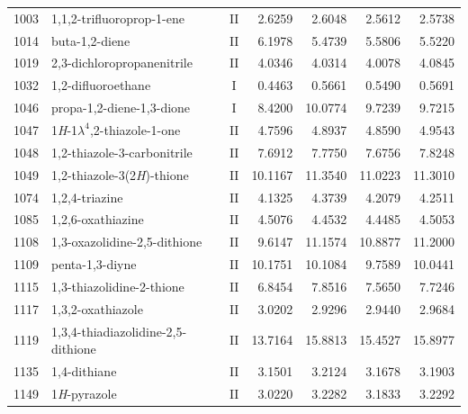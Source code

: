 \begin{longtable}{rlcd{2.5}d{2.5}d{2.5}d{2.5}}
    1003 & 1,1,2-trifluoroprop-1-ene                              & II & 2.6259  & 2.6048  & 2.5612  & 2.5738  \\
    1014 & buta-1,2-diene                                         & II & 6.1978  & 5.4739  & 5.5806  & 5.5220  \\
    1019 & 2,3-dichloropropanenitrile                             & II & 4.0346  & 4.0314  & 4.0078  & 4.0845  \\
    1032 & 1,2-difluoroethane                                     & I  & 0.4463  & 0.5661  & 0.5490  & 0.5691  \\
    1046 & propa-1,2-diene-1,3-dione                              & I  & 8.4200  & 10.0774 & 9.7239  & 9.7215  \\
    1047 & 1\textit{H}-1$\lambda^4$,2-thiazole-1-one              & II & 4.7596  & 4.8937  & 4.8590  & 4.9543  \\
    1048 & 1,2-thiazole-3-carbonitrile                            & II & 7.6912  & 7.7750  & 7.6756  & 7.8248  \\
    1049 & 1,2-thiazole-3(2\textit{H})-thione                     & II & 10.1167 & 11.3540 & 11.0223 & 11.3010 \\
    1074 & 1,2,4-triazine                                         & II & 4.1325  & 4.3739  & 4.2079  & 4.2511  \\
    1085 & 1,2,6-oxathiazine                                      & II & 4.5076  & 4.4532  & 4.4485  & 4.5053  \\
    1108 & 1,3-oxazolidine-2,5-dithione                           & II & 9.6147  & 11.1574 & 10.8877 & 11.2000 \\
    1109 & penta-1,3-diyne                                        & II & 10.1751 & 10.1084 & 9.7589  & 10.0441 \\
    1115 & 1,3-thiazolidine-2-thione                              & II & 6.8454  & 7.8516  & 7.5650  & 7.7246  \\
    1117 & 1,3,2-oxathiazole                                      & II & 3.0202  & 2.9296  & 2.9440  & 2.9684  \\
    1119 & 1,3,4-thiadiazolidine-2,5-dithione                     & II & 13.7164 & 15.8813 & 15.4527 & 15.8977 \\
    1135 & 1,4-dithiane                                           & II & 3.1501  & 3.2124  & 3.1678  & 3.1903  \\
    1149 & 1\textit{H}-pyrazole                                   & II & 3.0220  & 3.2282  & 3.1833  & 3.2292  \\

\end{longtable}
